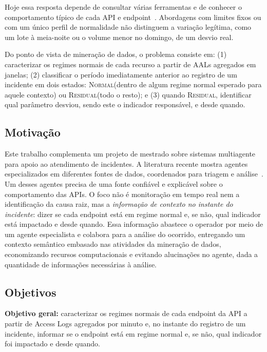 \documentclass[sigconf,nonacm]{acmart}
\newcommand{\Normal}{\textsc{Normal}\xspace}
\newcommand{\Residual}{\textsc{Residual}\xspace}
\begin{document}
Hoje essa resposta depende de consultar várias ferramentas e de conhecer o comportamento típico de cada API e endpoint~\citep{zhang2025isre}. Abordagens com limites fixos ou com um único perfil de normalidade não distinguem a variação legítima, como um lote à meia-noite ou o volume menor no domingo, de um desvio real.

Do ponto de vista de mineração de dados, o problema consiste em: (1) caracterizar os regimes normais de cada recurso a partir de AALs agregados em janelas; (2) classificar o período imediatamente anterior ao registro de um incidente em dois estados: \Normal (dentro de algum regime normal esperado para aquele contexto) ou \Residual (todo o resto); e (3) quando \Residual, identificar qual parâmetro desviou, sendo este o indicador responsável, e desde quando.

\subsection{Motivação}
Este trabalho complementa um projeto de mestrado sobre sistemas multiagente para apoio ao atendimento de incidentes. A literatura recente mostra agentes especializados em diferentes fontes de dados, coordenados para triagem e análise~\citep{yu2025triangle,luo2025opsagent,zhang2025isre}. Um desses agentes precisa de uma fonte confiável e explicável sobre o comportamento das APIs. O foco não é monitoração em tempo real nem a identificação da causa raiz, mas a \emph{informação de contexto no instante do incidente}: dizer se cada endpoint está em regime normal e, se não, qual indicador está impactado e desde quando. Essa informação abastece o operador por meio de um agente especialista e colabora para a análise do ocorrido, entregando um contexto semântico embasado nas atividades da mineração de dados, economizando recursos computacionais e evitando alucinações no agente, dada a quantidade de informações necessárias à análise.

\subsection{Objetivos}
\textbf{Objetivo geral:} caracterizar os regimes normais de cada endpoint da API a partir de Access Logs agregados por minuto e, no instante do registro de um incidente, informar se o endpoint está em regime normal e, se não, qual indicador foi impactado e desde quando.
\end{document}
